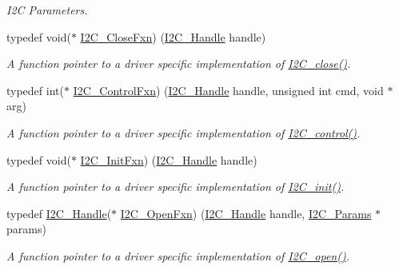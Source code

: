 \begin{DoxyCompactItemize}
\begin{DoxyCompactList}\small\item\em I2\+C Parameters. \end{DoxyCompactList}\item 
typedef void($\ast$ \hyperlink{_i2_c_8h_a083200108e980a0ef61e458f0b9fb9e7}{I2\+C\+\_\+\+Close\+Fxn}) (\hyperlink{_i2_c_8h_a5809a229f8395c87f59e63128195c1bf}{I2\+C\+\_\+\+Handle} handle)
\begin{DoxyCompactList}\small\item\em A function pointer to a driver specific implementation of \hyperlink{_i2_c_8h_a12c86d89a687f2ee1eb980d99c32326d}{I2\+C\+\_\+close()}. \end{DoxyCompactList}\item 
typedef int($\ast$ \hyperlink{_i2_c_8h_a4b15853f98d3d5e5135b8c52b8465fff}{I2\+C\+\_\+\+Control\+Fxn}) (\hyperlink{_i2_c_8h_a5809a229f8395c87f59e63128195c1bf}{I2\+C\+\_\+\+Handle} handle, unsigned int cmd, void $\ast$arg)
\begin{DoxyCompactList}\small\item\em A function pointer to a driver specific implementation of \hyperlink{_i2_c_8h_a633003582213a5098467a4e647cc52f9}{I2\+C\+\_\+control()}. \end{DoxyCompactList}\item 
typedef void($\ast$ \hyperlink{_i2_c_8h_adfb2451c8a1ce70402e43e4743c5fedf}{I2\+C\+\_\+\+Init\+Fxn}) (\hyperlink{_i2_c_8h_a5809a229f8395c87f59e63128195c1bf}{I2\+C\+\_\+\+Handle} handle)
\begin{DoxyCompactList}\small\item\em A function pointer to a driver specific implementation of \hyperlink{_i2_c_8h_a9ff51ddf1d325776fef90cce0223772b}{I2\+C\+\_\+init()}. \end{DoxyCompactList}\item 
typedef \hyperlink{_i2_c_8h_a5809a229f8395c87f59e63128195c1bf}{I2\+C\+\_\+\+Handle}($\ast$ \hyperlink{_i2_c_8h_add24fcdaaf1bdef1521ce2489bf1d80e}{I2\+C\+\_\+\+Open\+Fxn}) (\hyperlink{_i2_c_8h_a5809a229f8395c87f59e63128195c1bf}{I2\+C\+\_\+\+Handle} handle, \hyperlink{struct_i2_c___params}{I2\+C\+\_\+\+Params} $\ast$params)
\begin{DoxyCompactList}\small\item\em A function pointer to a driver specific implementation of \hyperlink{_i2_c_8h_ae1aa99e1fee4517406018e10025cca0e}{I2\+C\+\_\+open()}. \end{DoxyCompactList}\item 

\end{DoxyCompactItemize}
